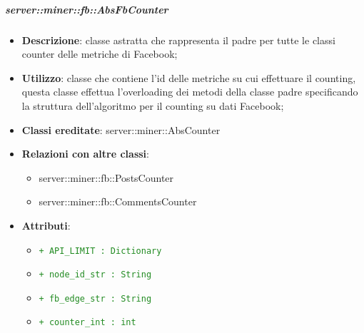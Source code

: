 		\subparagraph{server::miner::fb::AbsFbCounter} %
		\label{subp:server_miner_fb_AbsFbCounter}
			\begin{itemize}
				\item \textbf{Descrizione}: classe astratta che rappresenta il padre per tutte le classi counter delle metriche di Facebook;
				\item \textbf{Utilizzo}: classe che contiene l'id delle metriche su cui effettuare il counting, questa classe effettua l'overloading dei metodi della classe padre specificando la struttura dell'algoritmo per il counting su dati Facebook;
				\item \textbf{Classi ereditate}: server::miner::AbsCounter
				\item \textbf{Relazioni con altre classi}:
					\begin{itemize}
						\item server::miner::fb::PostsCounter
						\item server::miner::fb::CommentsCounter
					\end{itemize}
				\item \textbf{Attributi}:  
					\begin{itemize}
						\item \textcolor{forestgreen}{\texttt{+ API\_LIMIT : Dictionary}}
						\item \textcolor{forestgreen}{\texttt{+ node\_id\_str : String}}
						\item \textcolor{forestgreen}{\texttt{+ fb\_edge\_str : String}}
						\item \textcolor{forestgreen}{\texttt{+ counter\_int : int}}

\end{itemize}
\end{itemize}
